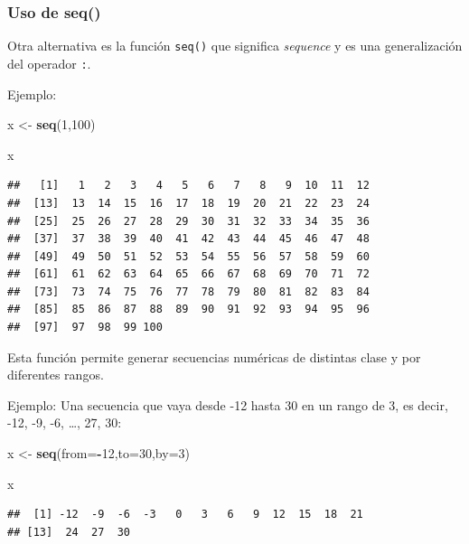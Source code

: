 \documentclass[
]{book}
\newenvironment{Shaded}{\begin{snugshade}}{\end{snugshade}}
\newcommand{\AttributeTok}[1]{\textcolor[rgb]{0.13,0.29,0.53}{#1}}
\newcommand{\DecValTok}[1]{\textcolor[rgb]{0.00,0.00,0.81}{#1}}
\newcommand{\FunctionTok}[1]{\textcolor[rgb]{0.13,0.29,0.53}{\textbf{#1}}}
\newcommand{\NormalTok}[1]{#1}
\newcommand{\OtherTok}[1]{\textcolor[rgb]{0.56,0.35,0.01}{#1}}
\newcommand{\SpecialCharTok}[1]{\textcolor[rgb]{0.81,0.36,0.00}{\textbf{#1}}}
\begin{document}
\subsubsection{Uso de seq()}\label{uso-de-seq}

Otra alternativa es la función \texttt{seq()} que significa \emph{sequence} y es una generalización del operador \texttt{:}.

Ejemplo:

\begin{Shaded}
\begin{Highlighting}[]
\NormalTok{x }\OtherTok{\textless{}{-}} \FunctionTok{seq}\NormalTok{(}\DecValTok{1}\NormalTok{,}\DecValTok{100}\NormalTok{)}

\NormalTok{x}
\end{Highlighting}
\end{Shaded}

\begin{verbatim}
##   [1]   1   2   3   4   5   6   7   8   9  10  11  12
##  [13]  13  14  15  16  17  18  19  20  21  22  23  24
##  [25]  25  26  27  28  29  30  31  32  33  34  35  36
##  [37]  37  38  39  40  41  42  43  44  45  46  47  48
##  [49]  49  50  51  52  53  54  55  56  57  58  59  60
##  [61]  61  62  63  64  65  66  67  68  69  70  71  72
##  [73]  73  74  75  76  77  78  79  80  81  82  83  84
##  [85]  85  86  87  88  89  90  91  92  93  94  95  96
##  [97]  97  98  99 100
\end{verbatim}

Esta función permite generar secuencias numéricas de distintas clase y por diferentes rangos.

Ejemplo:
Una secuencia que vaya desde -12 hasta 30 en un rango de 3, es decir, -12, -9, -6, \ldots, 27, 30:

\begin{Shaded}
\begin{Highlighting}[]
\NormalTok{x }\OtherTok{\textless{}{-}} \FunctionTok{seq}\NormalTok{(}\AttributeTok{from=}\SpecialCharTok{{-}}\DecValTok{12}\NormalTok{,}\AttributeTok{to=}\DecValTok{30}\NormalTok{,}\AttributeTok{by=}\DecValTok{3}\NormalTok{)}

\NormalTok{x}
\end{Highlighting}
\end{Shaded}

\begin{verbatim}
##  [1] -12  -9  -6  -3   0   3   6   9  12  15  18  21
## [13]  24  27  30
\end{verbatim}
\end{document}
